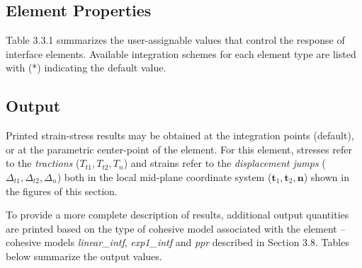\documentclass[11pt]{report}
\numberwithin{equation}{section}
\newcommand{\bmf } {\boldsymbol }  %
\newcommand{\ti}{\emph}
\begin{document}
\subsection{Element Properties}
Table 3.3.1 summarizes the user-assignable values 
that control the response of interface elements. Available integration schemes
for each element type are listed with (*) indicating the default
value. 
\subsection{Output}

Printed strain-stress results may be obtained at the integration points (default), 
or at the parametric center-point of the element. For this element, stresses refer to the
\ti{tractions} ($T_{t1}, T_{t2}, T_{n}$) and strains refer to the \ti{displacement jumps} ($\Delta_{t1},
\Delta_{t2},\Delta_n$) both in the local mid-plane 
coordinate system ($\bmf{t}_1, \bmf{t}_2,\bmf{ n}$) shown in the
figures of this section.

To provide a more complete description of results, additional output quantities are printed based on the 
type of cohesive model associated with the element -- 
cohesive models \ti{linear\_intf},  \ti{exp1\_intf} and \ti{ppr} described in Section 3.8. 
Tables below summarize the output values.
\end{document}
